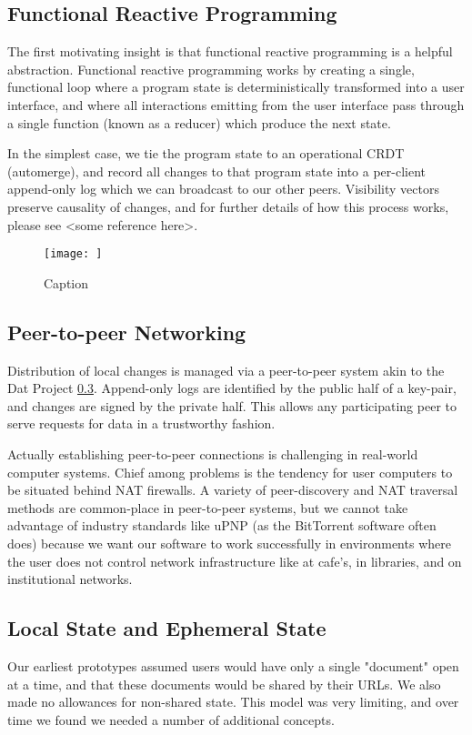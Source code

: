 \documentclass[sigplan,10pt]{acmart}
\begin{document}
\begin{itemize}
\subsection{Functional Reactive Programming}
The first motivating insight is that functional reactive programming is a helpful abstraction. Functional reactive programming works by creating a single, functional loop where a program state is deterministically transformed into a user interface, and where all interactions emitting from the user interface pass through a single function (known as a reducer) which produce the next state.

In the simplest case, we tie the program state to an operational CRDT (automerge), and record all changes to that program state into a per-client append-only log which we can broadcast to our other peers. Visibility vectors preserve causality of changes, and for further details of how this process works, please see <some reference here>.

\begin{figure}
    \centering
    \texttt{[image: ]}
    \caption{Caption}
    \label{fig:my_label}
\end{figure}

\subsection{Peer-to-peer Networking}
Distribution of local changes is managed via a peer-to-peer system akin to the Dat Project \ref{}. Append-only logs are identified by the public half of a key-pair, and changes are signed by the private half. This allows any participating peer to serve requests for data in a trustworthy fashion.  

Actually establishing peer-to-peer connections is challenging in real-world computer systems. Chief among problems is the tendency for user computers to be situated behind NAT firewalls. A variety of peer-discovery and NAT traversal methods are common-place in peer-to-peer systems, but we cannot take advantage of industry standards like uPNP (as the BitTorrent software often does) because we want our software to work successfully in environments where the user does not control network infrastructure like at cafe's, in libraries, and on institutional networks.


\subsection{Local State and Ephemeral State}
Our earliest prototypes assumed users would have only a single "document" open at a time, and that these documents would be shared by their URLs. We also made no allowances for non-shared state. This model was very limiting, and over time we found we needed a number of additional concepts.


\end{itemize}
\end{document}
